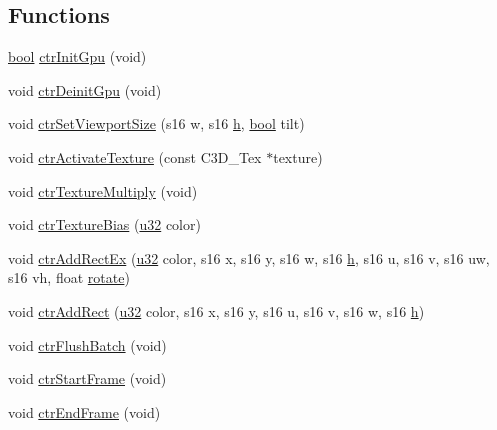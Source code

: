 \subsection*{Functions}
\begin{DoxyCompactItemize}
\item 
\mbox{\hyperlink{libretro_8h_a4a26dcae73fb7e1528214a068aca317e}{bool}} \mbox{\hyperlink{ctr-gpu_8h_a04a94149209a778c397be256b872da4a}{ctr\+Init\+Gpu}} (void)
\item 
void \mbox{\hyperlink{ctr-gpu_8h_a351de94984c7d5ffca8dd11c840f0da1}{ctr\+Deinit\+Gpu}} (void)
\item 
void \mbox{\hyperlink{ctr-gpu_8h_a10edf7402a10780992aef77c359f99b4}{ctr\+Set\+Viewport\+Size}} (s16 w, s16 \mbox{\hyperlink{isa-lr35902_8c_a06a62682361411df32cf88f75a0b8da4}{h}}, \mbox{\hyperlink{libretro_8h_a4a26dcae73fb7e1528214a068aca317e}{bool}} tilt)
\item 
void \mbox{\hyperlink{ctr-gpu_8h_aad6f8dfb30a010444bf5c7420904d852}{ctr\+Activate\+Texture}} (const C3\+D\+\_\+\+Tex $\ast$texture)
\item 
void \mbox{\hyperlink{ctr-gpu_8h_aa14fb1c5b08247737637c60db4c01b7c}{ctr\+Texture\+Multiply}} (void)
\item 
void \mbox{\hyperlink{ctr-gpu_8h_ae1021d5113537160c2b2122305ac6980}{ctr\+Texture\+Bias}} (\mbox{\hyperlink{sqlite3_8c_a03ad5adfaeb9b7640dde78a0cc390319}{u32}} color)
\item 
void \mbox{\hyperlink{ctr-gpu_8h_aa59622aca4a180cff8a77bbc0397f4de}{ctr\+Add\+Rect\+Ex}} (\mbox{\hyperlink{sqlite3_8c_a03ad5adfaeb9b7640dde78a0cc390319}{u32}} color, s16 x, s16 y, s16 w, s16 \mbox{\hyperlink{isa-lr35902_8c_a06a62682361411df32cf88f75a0b8da4}{h}}, s16 u, s16 v, s16 uw, s16 vh, float \mbox{\hyperlink{gzappend_8c_a4f13e4c742e47380cfb3aa6744ff89a7}{rotate}})
\item 
void \mbox{\hyperlink{ctr-gpu_8h_a5a8136bc8fce40ba12da3cfaaa617bd4}{ctr\+Add\+Rect}} (\mbox{\hyperlink{sqlite3_8c_a03ad5adfaeb9b7640dde78a0cc390319}{u32}} color, s16 x, s16 y, s16 u, s16 v, s16 w, s16 \mbox{\hyperlink{isa-lr35902_8c_a06a62682361411df32cf88f75a0b8da4}{h}})
\item 
void \mbox{\hyperlink{ctr-gpu_8h_a7ab09886a00743bfac1d2b4aee447a34}{ctr\+Flush\+Batch}} (void)
\item 
void \mbox{\hyperlink{ctr-gpu_8h_a862d2bcd425f4872ebfd58274e948057}{ctr\+Start\+Frame}} (void)
\item 
void \mbox{\hyperlink{ctr-gpu_8h_afde5ab22c1fe022b58bee18e06dfa89e}{ctr\+End\+Frame}} (void)
\end{DoxyCompactItemize}


